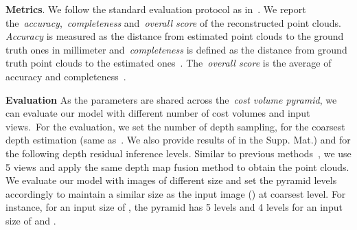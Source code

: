 \noindent\textbf{Metrics}. We follow the standard evaluation protocol as in~\cite{aanaes2016large,yao2018mvsnet}. We report the~\emph{accuracy},~\emph{completeness} and~\emph{overall score} of the reconstructed point clouds. \emph{Accuracy} is measured as the distance from  estimated point clouds to the ground truth ones in millimeter and~\emph{completeness} is defined as the distance from ground truth point clouds to the estimated ones~\cite{aanaes2016large}. The~\emph{overall score} is the average of accuracy and completeness~\cite{yao2018mvsnet}. 

\vspace{0.1cm}
\noindent\textbf{Evaluation} As the parameters are shared across the~\emph{cost volume pyramid}, we can evaluate our model with different number of cost volumes and input views.~For the evaluation, we set the number of depth sampling,  for the coarsest depth estimation (same as~\cite{chen2019point}. We also provide results of  in the Supp. Mat.) and  for the following depth residual inference levels. Similar to previous methods~\cite{chen2019point,yao2018mvsnet,yao2019recurrent}, we use 5 views and apply the same depth map fusion method to obtain the point clouds. We evaluate our model with images of different size and set the pyramid levels accordingly to maintain a similar size as the input image () at coarsest level. For instance, for an input size of , the pyramid has 5 levels and 4 levels for an input size of  and .

